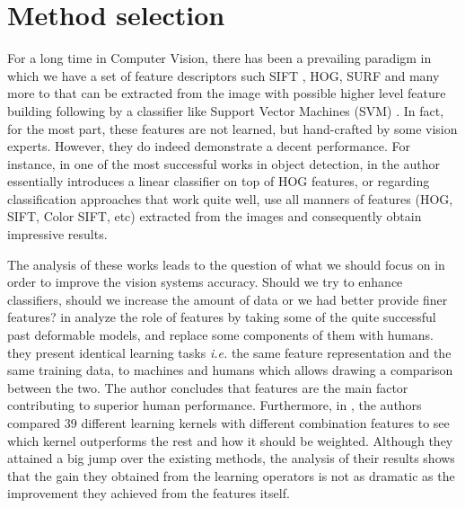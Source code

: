 

\section{Method selection}

For a long time in Computer Vision, there has been a prevailing paradigm in which we have a set of feature descriptors such SIFT \cite{lowe1999object}, HOG\cite{dalal2005histograms}, SURF\cite{bay2006surf} and many more to that can be extracted from the image with possible higher level feature building following by a classifier like Support Vector Machines (SVM) \cite{vapnik1964note, boser1992training}. In fact, for the most part, these features are not learned, but hand-crafted by some vision experts. However, they do indeed demonstrate a decent performance. For instance, in one of the most successful works in object detection, in \cite{felzenszwalb2010object} the author essentially introduces a linear classifier on top of HOG features, or regarding classification approaches that work quite well, \citeauthor{yu2010object} use all manners of features (HOG, SIFT, Color SIFT, etc) extracted from the images and consequently obtain impressive results. 

\indent The analysis of these works leads to the question of what we should focus on in order to improve the vision systems accuracy. Should we try to enhance classifiers, should we increase the amount of data or we had better provide finer features? \citeauthor*{parikh2010role} in \cite{parikh2010role} analyze the role of features by taking some of the quite successful past deformable models\cite{albrecht2015deformable}, and replace some components of them with humans. they present identical learning tasks \textit{i.e.} the same feature representation and the same training data, to machines and humans which allows drawing a comparison between the two. The author concludes that features are the main factor contributing to superior human performance. Furthermore, in \cite{gehler2009feature}, the authors compared 39 different learning kernels with different combination features to see which kernel outperforms the rest and how it should be weighted. Although they attained a big jump over the existing methods, the analysis of their results shows that the gain they obtained from the learning operators is not as dramatic as the improvement they achieved from the features itself. 

